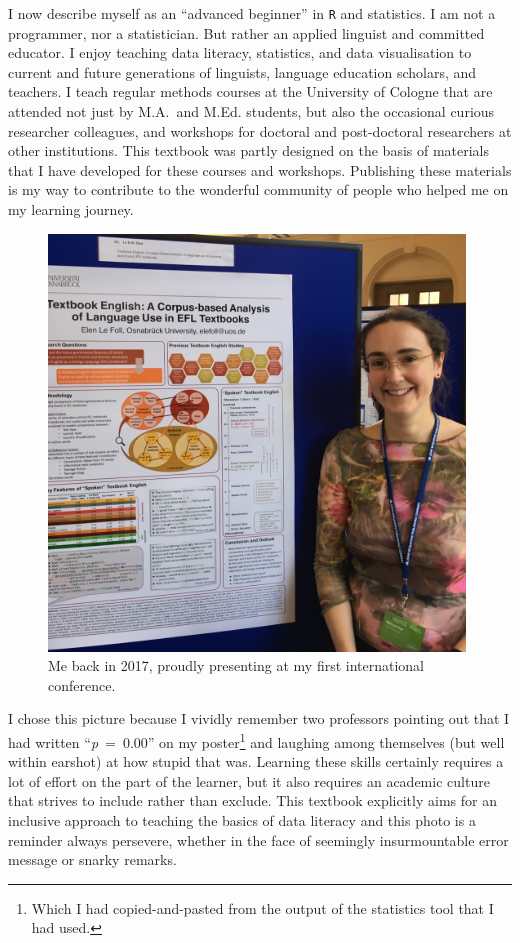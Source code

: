 \documentclass[
  letterpaper,
  DIV=11,
  numbers=noendperiod]{scrreprt}
\begin{document}
I now describe myself as an ``advanced beginner'' in \texttt{R} and
statistics. I am not a programmer, nor a statistician. But rather an
applied linguist and committed educator. I enjoy teaching data literacy,
statistics, and data visualisation to current and future generations of
linguists, language education scholars, and teachers. I teach regular
methods courses at the University of Cologne that are attended not just
by M.A.~and M.Ed. students, but also the occasional curious researcher
colleagues, and workshops for doctoral and post-doctoral researchers at
other institutions. This textbook was partly designed on the basis of
materials that I have developed for these courses and workshops.
Publishing these materials is my way to contribute to the wonderful
community of people who helped me on my learning journey.

\begin{figure}[H]

{\centering \includegraphics[width=4.35417in,height=\textheight]{images/CL2017_6.jpeg}

}

\caption{Me back in 2017, proudly presenting at my first international
conference.}

\end{figure}%

I chose this picture because I vividly remember two professors pointing
out that I had written ``\emph{p}~=~0.00'' on my poster\footnote{Which I
  had copied-and-pasted from the output of the statistics tool that I
  had used.} and laughing among themselves (but well within earshot) at
how stupid that was. Learning these skills certainly requires a lot of
effort on the part of the learner, but it also requires an academic
culture that strives to include rather than exclude. This textbook
explicitly aims for an inclusive approach to teaching the basics of data
literacy and this photo is a reminder always persevere, whether in the
face of seemingly insurmountable error message or snarky remarks.
\end{document}
